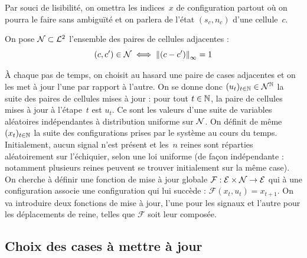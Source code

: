 Par souci de lisibilité, on omettra les indices~$x$ de configuration partout où on pourra le faire sans ambiguïté et on parlera de l'état $(s_c, n_c)$ d'une cellule~$c$.

On pose $\mathcal{N} \subset \mathcal{L}^2$ l'ensemble des paires de cellules adjacentes : $$(c, c') \in \mathcal{N} \iff \left\lVert(c-c')\right\rVert_\infty = 1$$

À chaque pas de temps, on choisit au hasard une paire de cases adjacentes et on les met à jour l'une par rapport à l'autre.
On se donne donc $(u_t)_{t\in\mathbb{N}} \in \mathcal{N}^{\mathbb{N}}$ la suite des paires de cellules mises à jour : pour tout $t\in\mathbb{N}$, la paire de cellules mises à jour à l'étape~$t$ est $u_t$. Ce sont les valeurs d'une suite de variables aléatoires indépendantes à distribution uniforme sur $\mathcal{N}$. On définit de même $(x_t)_{t\in\mathbb{N}}$ la suite des configurations prises par le système au cours du temps. Initialement, aucun signal n'est présent et les~$n$ reines sont réparties aléatoirement sur l'échiquier, selon une loi uniforme (de façon indépendante : notamment plusieurs reines peuvent se trouver initialement sur la même case). 
On cherche à définir une fonction de mise à jour globale $\mathcal{F} : {\mathcal{E}\times\mathcal{N}}\to\mathcal{E}$ qui à une configuration associe une configuration qui lui succède : \mbox{$\mathcal{F}(x_t, u_t) = x_{t+1}$}.
On va introduire deux fonctions de mise à jour, l'une pour les signaux et l'autre pour les déplacements de reine, telles que $\mathcal{F}$ soit leur composée.

 
\subsection{Choix des cases à mettre à jour}

